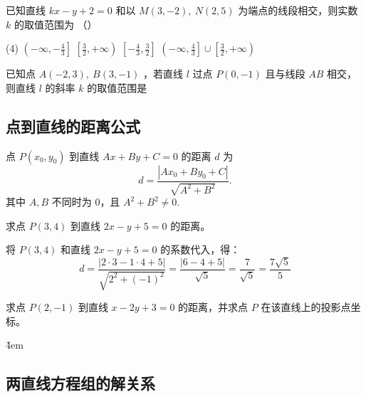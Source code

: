 \begin{example}
    已知直线 $k x-y+2=0$ 和以 $M(3,-2), ~ N(2,5)$ 为端点的线段相交，则实数 $k$ 的取值范围为 （\qquad）
    \begin{tasks}(4)
        \task $\left(-\infty,-\frac{4}{3}\right]$
            \task $\left[\frac{3}{2},+\infty\right)$
        \task $\left[-\frac{4}{3}, \frac{3}{2}\right]$
        \task $\left(-\infty, \frac{4}{3}\right] \cup\left[\frac{3}{2},+\infty\right)$
    \end{tasks}
\end{example}

\vspace{6em}

\begin{example}
    已知点 $A(-2,3), ~ B(3,-1)$ ，若直线 $l$ 过点 $P(0,-1)$ 且与线段 $A B$ 相交，则直线 $l$ 的斜率 $k$ 的取值范围是 \underline{\qquad}
\end{example}

\vspace{4em}

\subsection{点到直线的距离公式}

\begin{theorem}[点到直线的距离公式]
    点 $P(x_0, y_0)$ 到直线 $Ax + By + C = 0$ 的距离 $d$ 为
    \[
        d = \frac{|Ax_0 + By_0 + C|}{\sqrt{A^2 + B^2}}.
    \]
    其中 $A, B$ 不同时为 $0$，且 $A^2 + B^2 \neq 0$.
\end{theorem}

\begin{example}
    求点 $P(3,4)$ 到直线 $2x - y + 5 = 0$ 的距离。
\end{example}

\begin{solution}
    将 $P(3,4)$ 和直线 $2x - y + 5 = 0$ 的系数代入，得：
    \[
        d = \frac{|2 \cdot 3 - 1 \cdot 4 + 5|}{\sqrt{2^2 + (-1)^2}} = \frac{|6 - 4 + 5|}{\sqrt{5}} = \frac{7}{\sqrt{5}} = \frac{7\sqrt{5}}{5}
    \]
\end{solution}

\begin{example}
    求点 $P(2,-1)$ 到直线 $x - 2y + 3 = 0$ 的距离，并求点 $P$ 在该直线上的投影点坐标。
\end{example}

\v{4em}

\subsection{两直线方程组的解关系}

